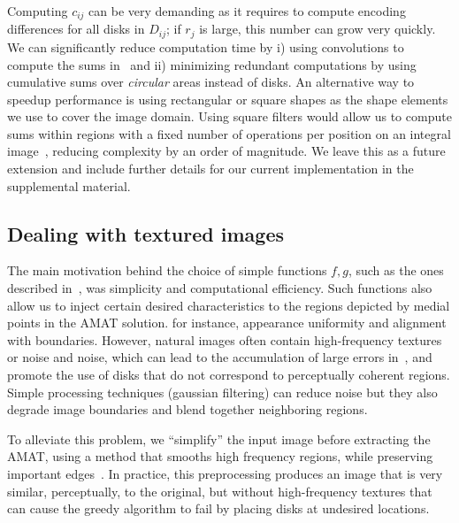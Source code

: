 \documentclass[10pt,twocolumn,letterpaper]{article}
\begin{document}
Computing $c_{ij}$ can be very demanding as it requires to compute encoding differences for all 
disks in $D_{ij}$; if $r_j$ is large, this number can grow very quickly.
We can significantly reduce computation time by i) using convolutions to compute the sums in~
and ii) minimizing redundant computations by using cumulative sums over \emph{circular} areas instead of disks.
An alternative way to speedup performance is using rectangular or square shapes as the
shape elements we use to cover the image domain.
Using square filters would allow us to compute sums within regions with a fixed number of operations per position on an integral
image~\cite{viola2001rapid,arbelaez2011contour}, reducing complexity by an order of magnitude.
We leave this as a future extension and include further details for our current implementation in the supplemental material.


\subsection{Dealing with textured images}\label{sec:method:texture}
The main motivation behind the choice of simple functions $f,g$, such as the ones described in~, was simplicity and 
computational efficiency.
Such functions also allow us to inject certain desired characteristics to the regions depicted by medial points in the AMAT solution.
for instance, appearance uniformity and alignment with boundaries.
However, natural images often contain high-frequency textures or noise and noise, which can lead to the accumulation of large errors 
in~, and promote the use of disks that do not correspond to perceptually coherent regions. 
Simple processing techniques (\eg gaussian filtering) can reduce noise but they also degrade image boundaries and
blend together neighboring regions.

To alleviate this problem, we ``simplify'' the input image before extracting the AMAT, using a method that smooths high frequency
regions, while preserving important edges~\cite{xu2011image}.
In practice, this preprocessing produces an image that is very similar, perceptually, to the original, 
but without high-frequency textures that can cause the greedy algorithm to fail by placing disks at undesired locations.
\end{document}
